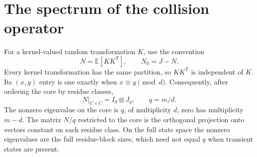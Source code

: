 
\section{The spectrum of the collision operator}
For a kernel-valued random transformation $K$, use the convention
\[
 N=\mathbb E[KK^{\mathsf T}],\qquad N_0=J-N.
\]
Every kernel transformation has the same partition, so $KK^{\mathsf T}$
is independent of $K$. Its $(x,y)$ entry is one exactly when
$x\equiv y\pmod d$. Consequently, after ordering the core by residue classes,
\[
 N|_{C\times C}=I_d\otimes J_q,\qquad q=m/d.
\]
The nonzero eigenvalue on the core is $q$, of multiplicity $d$; zero has
multiplicity $m-d$. The matrix $N/q$ restricted to the core is the orthogonal
projection onto vectors constant on each residue class. On the full state
space the nonzero eigenvalues are the full residue-block sizes, which need
not equal $q$ when transient states are present.
